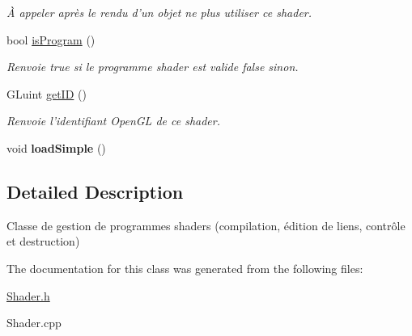 \begin{DoxyCompactItemize}
\begin{DoxyCompactList}\small\item\em À appeler après le rendu d'un objet ne plus utiliser ce shader. \end{DoxyCompactList}\item 
\hypertarget{classShader_aae9136479d5affe1b14f1c79efe79600}{bool \hyperlink{classShader_aae9136479d5affe1b14f1c79efe79600}{is\+Program} ()}\label{classShader_aae9136479d5affe1b14f1c79efe79600}

\begin{DoxyCompactList}\small\item\em Renvoie true si le programme shader est valide false sinon. \end{DoxyCompactList}\item 
\hypertarget{classShader_ad1bc9a16400499ec80c4f716a390abaf}{G\+Luint \hyperlink{classShader_ad1bc9a16400499ec80c4f716a390abaf}{get\+I\+D} ()}\label{classShader_ad1bc9a16400499ec80c4f716a390abaf}

\begin{DoxyCompactList}\small\item\em Renvoie l'identifiant Open\+G\+L de ce shader. \end{DoxyCompactList}\item 
\hypertarget{classShader_aafa6167c1e130229a19a90bee95aaff0}{void {\bfseries load\+Simple} ()}\label{classShader_aafa6167c1e130229a19a90bee95aaff0}

\end{DoxyCompactItemize}


\subsection{Detailed Description}
Classe de gestion de programmes shaders (compilation, édition de liens, contrôle et destruction) 

The documentation for this class was generated from the following files\+:\begin{DoxyCompactItemize}
\item 
\hyperlink{Shader_8h}{Shader.\+h}\item 
Shader.\+cpp\end{DoxyCompactItemize}
